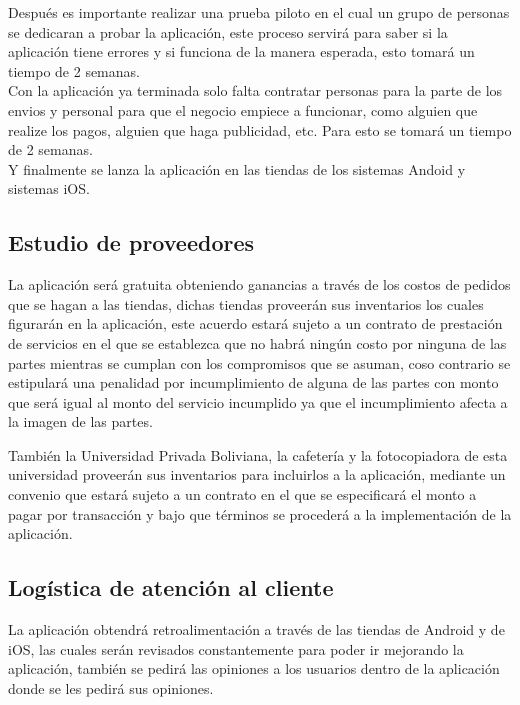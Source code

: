 \documentclass[11pt]{article}
\begin{document}
   Después es importante realizar una prueba piloto en el cual un grupo de personas se dedicaran a probar la aplicación, este proceso servirá para saber si la aplicación tiene errores y si funciona de la manera esperada, esto tomar\'a un tiempo de 2 semanas.\\
   
   Con la aplicaci\'on ya terminada solo falta contratar personas para la parte de los envios y personal para que el negocio empiece a funcionar, como alguien que realize los pagos, alguien que haga publicidad, etc. Para esto se tomar\'a un tiempo de 2 semanas.\\
   
   Y finalmente se lanza la aplicaci\'on en las tiendas de los sistemas Andoid y sistemas iOS.
   
   \subsection{Estudio de proveedores}
   La aplicación ser\'a gratuita obteniendo ganancias a través de los costos de pedidos que se hagan a las tiendas, dichas tiendas proveerán sus inventarios los cuales figurar\'an en la aplicación, este acuerdo estar\'a sujeto a un contrato de prestaci\'on de servicios en el que se establezca que no habr\'a ningún costo por ninguna de las partes mientras se cumplan con los compromisos que se asuman, coso contrario se estipular\'a una penalidad por incumplimiento de alguna de las partes con monto que ser\'a igual al monto del servicio incumplido ya que el incumplimiento afecta a la imagen de las partes.
   
   También la Universidad Privada Boliviana, la cafetería y la fotocopiadora de esta universidad proveerán sus inventarios para incluirlos a la aplicación, mediante un convenio que estar\'a sujeto a un contrato en el que se especificar\'a el monto a pagar por transacción y bajo que términos se procederá a la implementación de la aplicación.
   
   \subsection{Logística de atención al cliente}
   La aplicación obtendr\'a retroalimentación a través de las tiendas de Android y de iOS, las cuales ser\'an revisados constantemente para poder ir mejorando la aplicación, también se pedirá las opiniones a los usuarios dentro de la aplicación donde se les pedirá sus opiniones.
   
\end{document}
